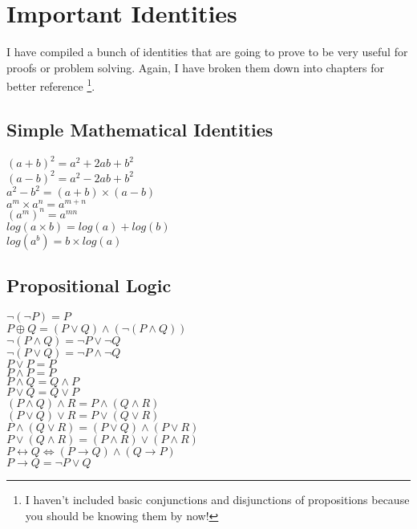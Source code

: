 \pagebreak[4]

\section{Important Identities}
\indent \indent I have compiled a bunch of identities that are going to prove
to be very useful for proofs or problem solving. Again, I have broken them down
into chapters for better reference \footnote{I haven't included basic
conjunctions and disjunctions of propositions because you should be knowing
them by now!}.
\subsection{Simple Mathematical Identities}
\indent \indent $(a + b)^{2} = a^{2} + 2ab + b^{2}$ \\
\indent $(a - b)^{2} = a^{2} - 2ab + b^{2}$ \\
\indent $a^{2} - b^{2} = (a + b)\times(a - b)$ \\
\indent $a^{m} \times a^{n} = a^{m + n}$ \\
\indent $(a^{m})^{n} = a^{mn}$ \\
\indent $log(a \times b) = log(a) + log(b)$ \\
\indent $log(a^{b}) = b \times log(a)$

\subsection{Propositional Logic}
\indent \indent $\neg (\neg P) = P$ \\
\indent $P \oplus Q = (P \vee Q) \wedge (\neg(P \wedge Q))$ \\
\indent $\neg(P \wedge Q) = \neg P \vee \neg Q$\\
\indent $\neg(P \vee Q) = \neg P \wedge \neg Q$ \\
\indent $P \vee P = P$\\
\indent $P \wedge P = P$\\
\indent $P \wedge Q = Q \wedge P$ \\
\indent $P \vee Q = Q \vee P$ \\
\indent $(P \wedge Q) \wedge R = P \wedge (Q \wedge R)$ \\
\indent $(P \vee Q) \vee R = P \vee (Q \vee R)$ \\
\indent $P \wedge (Q \vee R) = (P \vee Q) \wedge (P \vee R)$ \\
\indent $P \vee (Q \wedge R) = (P \wedge R) \vee (P \wedge R)$ \\
\indent $ P \leftrightarrow Q \Leftrightarrow (P \rightarrow Q) \wedge (Q
\rightarrow P)$ \\
\indent $P \rightarrow Q = \neg P \vee Q$ \\

